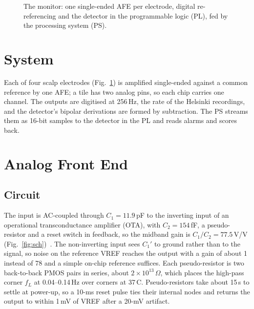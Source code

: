 \documentclass[conference]{IEEEtran}
\begin{document}
\begin{figure}[t]
\caption{The monitor: one single-ended AFE per electrode, digital re-referencing and the detector in the programmable logic (PL), fed by the processing system (PS).}
\label{fig:system}
\end{figure}

\section{System}

Each of four scalp electrodes (Fig.~\ref{fig:system}) is amplified single-ended against a common reference by one AFE; a tile has two analog pins, so each chip carries one channel. The outputs are digitised at 256\,Hz, the rate of the Helsinki recordings, and the detector's bipolar derivations are formed by subtraction. The PS streams them as 16-bit samples to the detector in the PL and reads alarms and scores back.

\section{Analog Front End}

\subsection{Circuit}

The input is AC-coupled through $C_1 = 11.9$\,pF to the inverting input of an operational transconductance amplifier (OTA), with $C_2 = 154$\,fF, a pseudo-resistor and a reset switch in feedback, so the midband gain is $C_1/C_2 = 77.5$\,V/V (Fig.~\ref{fig:sch})~\cite{harrison2003}. The non-inverting input sees $C_1'$ to ground rather than to the signal, so noise on the reference VREF reaches the output with a gain of about 1 instead of 78 and a simple on-chip reference suffices. Each pseudo-resistor is two back-to-back PMOS pairs in series, about $2\times10^{13}\,\Omega$, which places the high-pass corner $f_L$ at 0.04--0.14\,Hz over corners at 37\,\textdegree C. Pseudo-resistors take about 15\,s to settle at power-up, so a 10-ms reset pulse ties their internal nodes and returns the output to within 1\,mV of VREF after a 20-mV artifact.
\end{document}
